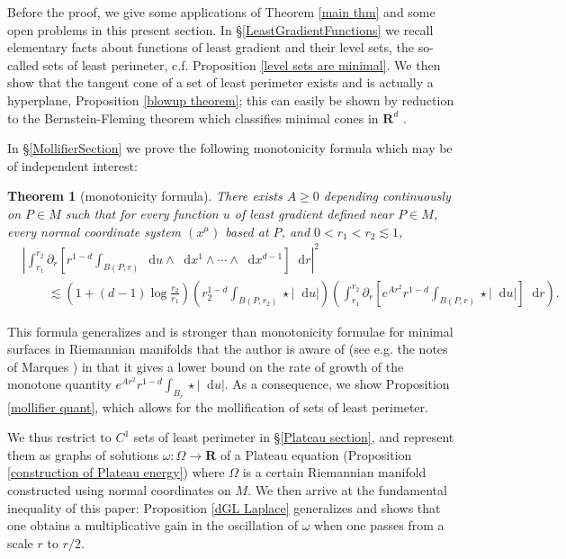 \documentclass[reqno,12pt,letterpaper]{amsart}
\newcommand{\RR}{\mathbf{R}}
\newcommand*\dif{\mathop{}\!\mathrm{d}}
\newtheorem{theorem}{Theorem}[section]
\theoremstyle{definition}
\numberwithin{equation}{section}
\begin{document}
Before the proof, we give some applications of Theorem \ref{main thm} and some open problems in this present section.
In \S\ref{LeastGradientFunctions} we recall elementary facts about functions of least gradient and their level sets, the so-called sets of least perimeter, c.f. Proposition \ref{level sets are minimal}.
We then show that the tangent cone of a set of least perimeter exists and is actually a hyperplane, Proposition \ref{blowup theorem}; this can easily be shown by reduction to the Bernstein-Fleming theorem which classifies minimal cones in $\RR^d$ \cite[Theorem 17.3]{Giusti77}.

In \S\ref{MollifierSection} we prove the following monotonicity formula which may be of independent interest:

\begin{theorem}[monotonicity formula]\label{monotonicity prestate}
There exists $A \geq 0$ depending continuously on $P \in M$ such that for every function $u$ of least gradient defined near $P \in M$, every normal coordinate system $(x^\mu)$ based at $P$, and $0 < r_1 < r_2 \lesssim 1$,
\begin{align*}
&\left|\int_{r_1}^{r_2} \partial_r \left[r^{1 - d} \int_{B(P, r)} \dif u \wedge \dif x^1 \wedge \cdots \wedge \dif x^{d - 1}\right] \dif r\right|^2 \\
&\qquad \lesssim \left(1 + (d - 1) \log \frac{r_2}{r_1}\right) \left(r_2^{1 - d}\int_{B(P, r_2)} \star |\dif u| \right)\left(\int_{r_1}^{r_2} \partial_r \left[e^{Ar^2} r^{1 - d} \int_{B(P, r)} \star |\dif u|\right] \dif r\right).
\end{align*}
\end{theorem}

This formula generalizes \cite[Theorem 2.8]{Miranda66} and is stronger than monotonicity formulae for minimal surfaces in Riemannian manifolds that the author is aware of (see e.g. the notes of Marques \cite[\S7]{MarquesXX}) in that it gives a lower bound on the rate of growth of the monotone quantity $e^{Ar^2} r^{1 - d} \int_{B_r} \star |\dif u|$.
As a consequence, we show Proposition \ref{mollifier quant}, which allows for the mollification of sets of least perimeter.

We thus restrict to $C^1$ sets of least perimeter in \S\ref{Plateau section}, and represent them as graphs of solutions $\omega: \Omega \to \RR$ of a Plateau equation (Proposition \ref{construction of Plateau energy}) where $\Omega$ is a certain Riemannian manifold constructed using normal coordinates on $M$.
We then arrive at the fundamental inequality of this paper: Proposition \ref{dGL Laplace} generalizes \cite[Teorema 4.3]{Miranda66} and shows that one obtains a multiplicative gain in the oscillation of $\omega$ when one passes from a scale $r$ to $r/2$.
\end{document}
